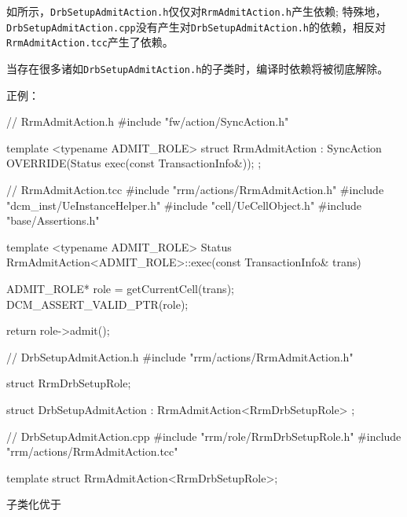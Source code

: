 \begin{content}
如所示，\texttt{DrbSetupAdmitAction.h}仅仅对\texttt{RrmAdmitAction.h}产生依赖; 特殊地，\texttt{DrbSetupAdmitAction.cpp}没有产生对\texttt{DrbSetupAdmitAction.h}的依赖，相反对\texttt{RrmAdmitAction.tcc}产生了依赖。

当存在很多诸如\texttt{DrbSetupAdmitAction.h}的子类时，编译时依赖将被彻底解除。

正例：
\begin{leftbar}
\begin{c++}
// RrmAdmitAction.h
#include "fw/action/SyncAction.h"

template <typename ADMIT_ROLE>
struct RrmAdmitAction : SyncAction
{
    OVERRIDE(Status exec(const TransactionInfo&));
};
\end{c++}
\end{leftbar}

\begin{leftbar}
\begin{c++}
// RrmAdmitAction.tcc
#include "rrm/actions/RrmAdmitAction.h"
#include "dcm_inst/UeInstanceHelper.h"
#include "cell/UeCellObject.h"
#include "base/Assertions.h"

template <typename ADMIT_ROLE>
Status RrmAdmitAction<ADMIT_ROLE>::exec(const TransactionInfo& trans)
{
    ADMIT_ROLE* role = getCurrentCell(trans);
    DCM_ASSERT_VALID_PTR(role);

    return role->admit(); 
}
\end{c++}
\end{leftbar}

\begin{leftbar}
\begin{c++}
// DrbSetupAdmitAction.h 
#include "rrm/actions/RrmAdmitAction.h"

struct RrmDrbSetupRole;

struct DrbSetupAdmitAction : RrmAdmitAction<RrmDrbSetupRole> {};
\end{c++}
\end{leftbar}

\begin{leftbar}
\begin{c++}
// DrbSetupAdmitAction.cpp
#include "rrm/role/RrmDrbSetupRole.h"
#include "rrm/actions/RrmAdmitAction.tcc"

template struct RrmAdmitAction<RrmDrbSetupRole>;

\end{c++}
\end{leftbar}

\begin{advise}
子类化优于
\end{advise}


\end{content}
